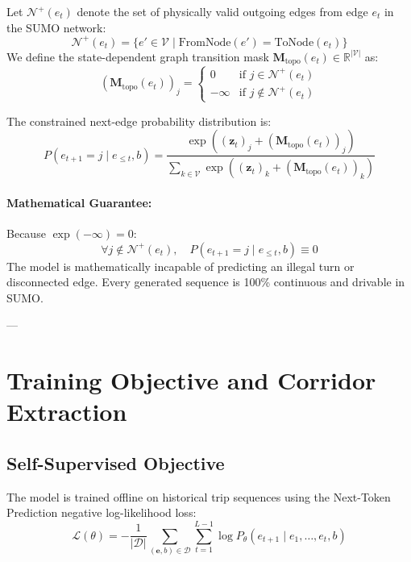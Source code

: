 \documentclass[11pt,a4paper]{article}
\begin{document}
Let $\mathcal{N}^+(e_t)$ denote the set of physically valid outgoing edges from edge $e_t$ in the SUMO network:
\begin{equation}
\mathcal{N}^+(e_t) = \{ e' \in \mathcal{V} \mid \text{FromNode}(e') = \text{ToNode}(e_t) \}
\end{equation}
We define the state-dependent graph transition mask $\mathbf{M}_{\text{topo}}(e_t) \in \mathbb{R}^{|\mathcal{V}|}$ as:
\begin{equation}
(\mathbf{M}_{\text{topo}}(e_t))_j = \begin{cases} 
0 & \text{if } j \in \mathcal{N}^+(e_t) \\
-\infty & \text{if } j \notin \mathcal{N}^+(e_t)
\end{cases}
\end{equation}

The constrained next-edge probability distribution is:
\begin{equation}
P(e_{t+1} = j \mid e_{\le t}, b) = \frac{\exp\left( (\mathbf{z}_t)_j + (\mathbf{M}_{\text{topo}}(e_t))_j \right)}{\sum_{k \in \mathcal{V}} \exp\left( (\mathbf{z}_t)_k + (\mathbf{M}_{\text{topo}}(e_t))_k \right)}
\end{equation}

\paragraph{Mathematical Guarantee:} 
Because $\exp(-\infty) = 0$:
\begin{equation}
\forall j \notin \mathcal{N}^+(e_t), \quad P(e_{t+1} = j \mid e_{\le t}, b) \equiv 0
\end{equation}
The model is mathematically incapable of predicting an illegal turn or disconnected edge. Every generated sequence is 100\% continuous and drivable in SUMO.

---

\section{Training Objective and Corridor Extraction}

\subsection{Self-Supervised Objective}
The model is trained offline on historical trip sequences using the Next-Token Prediction negative log-likelihood loss:
\begin{equation}
\mathcal{L}(\theta) = - \frac{1}{|\mathcal{D}|} \sum_{(\mathbf{e}, b) \in \mathcal{D}} \sum_{t=1}^{L-1} \log P_\theta(e_{t+1} \mid e_1, \dots, e_t, b)
\end{equation}
\end{document}
